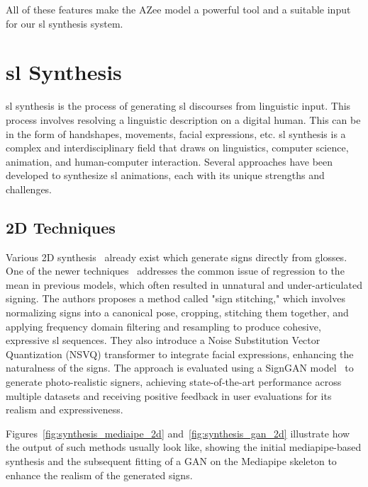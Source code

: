 \documentclass[../../main.tex]{subfiles}
\begin{document}
All of these features make the AZee model a powerful tool and a suitable input for our \gls{sl} synthesis system.

\section{\gls{sl} Synthesis}
\label{ch:background_work:sign_language_synthesis}

\gls{sl} synthesis is the process of generating \gls{sl} discourses from linguistic input. This process involves resolving a linguistic description on a digital human. This can be in the form of handshapes, movements, facial expressions, etc. \gls{sl} synthesis is a complex and interdisciplinary field that draws on linguistics, computer science, animation, and human-computer interaction. Several approaches have been developed to synthesize \gls{sl} animations, each with its unique strengths and challenges.

\subsection{2D Techniques}
\label{ch:background_work:sign_language_synthesis:2d_techniques}

Various 2D synthesis~\cite{jiang2024signclipconnectingtextsign, moryossef2024signmtrealtimemultilingualsign} already exist which generate signs directly from \gls{glosses}. One of the newer techniques~\cite{walsh2024sign} addresses the common issue of regression to the mean in previous models, which often resulted in unnatural and under-articulated signing. The authors proposes a method called "sign stitching," which involves normalizing signs into a canonical pose, cropping, stitching them together, and applying frequency domain filtering and resampling to produce cohesive, expressive \gls{sl} sequences. They also introduce a Noise Substitution Vector Quantization (NSVQ) transformer to integrate facial expressions, enhancing the naturalness of the signs. The approach is evaluated using a SignGAN model~\cite{saunders2020everybodysignnowtranslating} to generate photo-realistic signers, achieving state-of-the-art performance across multiple datasets and receiving positive feedback in user evaluations for its realism and expressiveness.

Figures~\ref{fig:synthesis_mediaipe_2d} and~\ref{fig:synthesis_gan_2d} illustrate how the output of such methods usually look like, showing the initial mediapipe-based synthesis and the subsequent fitting of a GAN on the Mediapipe skeleton to enhance the realism of the generated signs.
\end{document}
